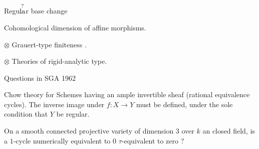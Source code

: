 Regu\(\overset{\text{\scriptsize ?}}{\text{la}}\)r base change 

Cohomological dimension of affine morphisms.

$\otimes$ Grauert-type finiteness .

$\otimes$ Theories  of rigid-analytic type.

Questions in SGA 1962


 Chow theory for  Schemes having an ample invertible sheaf (rational equivalence \unsure{,} cycles). The inverse image under $f:X\to Y$ must be defined, under the sole condition that $Y$ be regular.

\hspace{.4em} On a smooth connected projective variety of dimension $3$ over $k$ an  closed field, is a $1$-cycle numerically equivalent to $0$ $\tau$-equivalent to zero ? 
\normalmarginpar
